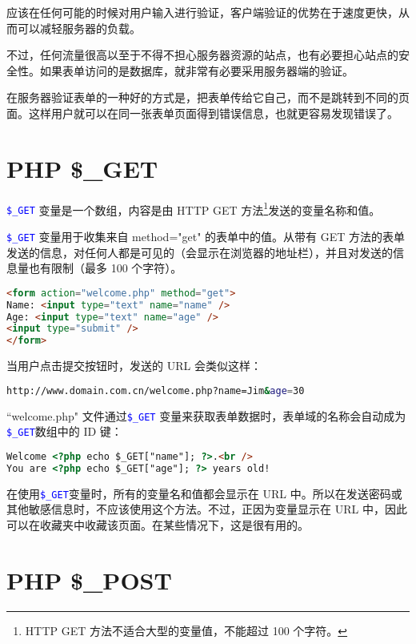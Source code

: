 应该在任何可能的时候对用户输入进行验证，客户端验证的优势在于速度更快，从而可以减轻服务器的负载。


不过，任何流量很高以至于不得不担心服务器资源的站点，也有必要担心站点的安全性。如果表单访问的是数据库，就非常有必要采用服务器端的验证。

在服务器验证表单的一种好的方式是，把表单传给它自己，而不是跳转到不同的页面。这样用户就可以在同一张表单页面得到错误信息，也就更容易发现错误了。



\chapter{PHP \$\_GET}

\textcolor{Blue}{\texttt{\$\_GET}} 变量是一个数组，内容是由 HTTP GET 方法\footnote{HTTP GET 方法不适合大型的变量值，不能超过 100 个字符。}发送的变量名称和值。


\textcolor{Blue}{\texttt{\$\_GET}} 变量用于收集来自 method="get" 的表单中的值。从带有 GET 方法的表单发送的信息，对任何人都是可见的（会显示在浏览器的地址栏），并且对发送的信息量也有限制（最多 100 个字符）。

\begin{lstlisting}[language=HTML]
<form action="welcome.php" method="get">
Name: <input type="text" name="name" />
Age: <input type="text" name="age" />
<input type="submit" />
</form>
\end{lstlisting}

当用户点击提交按钮时，发送的 URL 会类似这样：

\begin{lstlisting}[language=bash]
http://www.domain.com.cn/welcome.php?name=Jim&age=30
\end{lstlisting}

``welcome.php" 文件通过\textcolor{Blue}{\texttt{\$\_GET}} 变量来获取表单数据时，表单域的名称会自动成为\textcolor{Blue}{\texttt{\$\_GET}}数组中的 ID 键：

\begin{lstlisting}[language=HTML]
Welcome <?php echo $_GET["name"]; ?>.<br />
You are <?php echo $_GET["age"]; ?> years old!
\end{lstlisting}

在使用\textcolor{Blue}{\texttt{\$\_GET}}变量时，所有的变量名和值都会显示在 URL 中。所以在发送密码或其他敏感信息时，不应该使用这个方法。不过，正因为变量显示在 URL 中，因此可以在收藏夹中收藏该页面。在某些情况下，这是很有用的。


\chapter{PHP \$\_POST}

